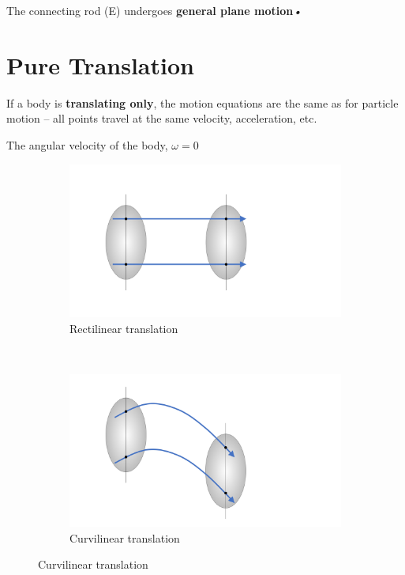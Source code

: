 \documentclass[12pt,letterpaper,twoside]{report}
\begin{document}
The connecting rod (E) undergoes \textbf{general plane motion}\textsl{•}


\section{Pure Translation}
If a body is \textbf{translating only}, the motion equations are the same as for particle motion – all points travel at the same velocity, acceleration, etc.

The angular velocity of the body, $\omega = 0$

\begin{figure}[H]
\centering
\begin{subfigure}[b]{0.4\textwidth}
\includegraphics[trim={2cm 2cm 8.5cm 2cm},clip,width=\textwidth]{Slide3}
        \caption{Rectilinear translation}
        \label{fig:Slide3}
    \end{subfigure}
    ~ 
    \begin{subfigure}[b]{0.4\textwidth}
\includegraphics[trim={2cm 1.5cm 8.5cm 2cm},clip,width=\textwidth]{Slide4}
        \caption{Curvilinear translation}
        \label{fig:Slide4}
    \end{subfigure}

\end{figure}
\end{document}
